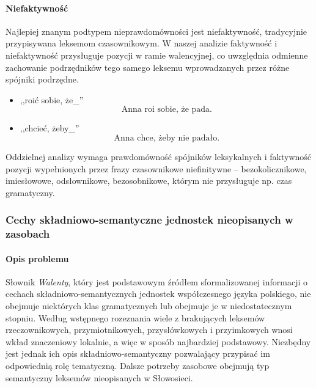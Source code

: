 \documentclass[12pt]{mwart}
\theoremstyle{remark}
\begin{document}
\paragraph{Niefaktywność} %
Najlepiej znanym podtypem nieprawdomówności jest niefaktywność, tradycyjnie przypisywana leksemom czasownikowym. W naszej analizie faktywność i niefaktywność przysługuje pozycji w ramie walencyjnej, co uwzględnia odmienne zachowanie podrzędników tego samego leksemu wprowadzanych przez różne spójniki podrzędne.
\begin{itemize}
	\item ,,roić sobie, że\_''
	\begin{equation}
		\text{Anna roi sobie, że pada.} 
	\end{equation}
	\item ,,chcieć, żeby\_''
	\begin{equation}
		\text{Anna chce, żeby nie padało.} 
	\end{equation}
\end{itemize}

Oddzielnej analizy wymaga prawdomówność spójników leksykalnych i faktywność pozycji wypełnionych przez frazy czasownikowe niefinitywne -- bezokolicznikowe, imiesłowowe, odsłownikowe, bezosobnikowe, którym nie przysługuje np. czas gramatyczny.
	

\subsubsection{Cechy składniowo-semantyczne jednostek nieopisanych w zasobach} %
{
\paragraph{Opis problemu} %
\label{sub:opis_problemu}
}
Słownik \emph{Walenty}, który jest podstawowym źródłem sformalizowanej informacji o cechach składniowo-semantycznych jednostek współczesnego języka polskiego, nie obejmuje niektórych klas gramatycznych lub obejmuje je w niedostatecznym stopniu.
Według wstępnego rozeznania wiele z brakujących leksemów rzeczownikowych, przymiotnikowych, przysłówkowych i przyimkowych wnosi wkład znaczeniowy lokalnie, a więc w sposób najbardziej podstawowy. Niezbędny jest jednak ich opis składniowo-semantyczny pozwalający przypisać im odpowiednią rolę tematyczną.
Dalsze potrzeby zasobowe obejmują typ semantyczny leksemów nieopisanych w Słowosieci.
\end{document}
